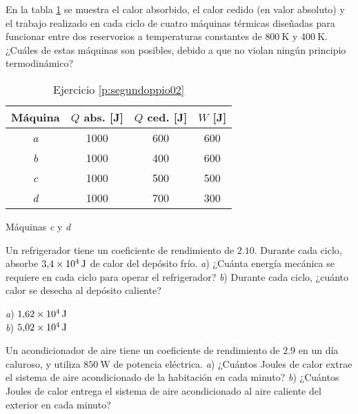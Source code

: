 %
\begin{Exercise}\label{p:segundoppio02}
  En la tabla \ref{t:segundoppio02} se muestra el calor absorbido, el calor cedido (en valor absoluto) y el trabajo realizado en cada ciclo de cuatro máquinas térmicas diseñadas para funcionar entre dos reservorios a temperaturas constantes de $\SI{800}{\kelvin}$ y $\SI{400}{\kelvin}$. ¿Cuáles de estas máquinas son posibles, debido a que no violan ningún principio termodinámico?\\
  \begin{table}[h]
    \caption{Ejercicio \ref{p:segundoppio02}}\label{t:segundoppio02}
    \centering
    \begin{tabular}{cccc}
        \hline
        \textbf{Máquina} & \textbf{$Q$ abs. [J]} & \textbf{$Q$ ced. [J]} & \textbf{$W$ [J]}\\
        \hline
        \textit{a} & 1000 & 600 & 600\\
        \textit{b} & 1000 & 400 & 600\\
        \textit{c} & 1000 & 500 & 500\\
        \textit{d} & 1000 & 700 & 300\\
        \hline
    \end{tabular}
  \end{table}
\end{Exercise}
\begin{Answer}
	\begin{minipage}[t]{.4\textwidth}
    Máquinas \textit{c} y \textit{d}
  \end{minipage}
\end{Answer}
%
\begin{Exercise}
  Un refrigerador tiene un coeficiente de rendimiento de $2.10$. Durante cada ciclo, absorbe $\SI{3.4E4}{\joule}$ de calor del depósito frío. \textit{a}) ¿Cuánta energía mecánica se requiere en cada ciclo para operar el refrigerador? \textit{b}) Durante cada ciclo, ¿cuánto calor se desecha al depósito caliente?
\end{Exercise}
\begin{Answer}
	\begin{minipage}[t]{.4\textwidth}
    \textit{a}) $\SI{1.62E4}{\joule}$\\ \textit{b}) $\SI{5.02E4}{\joule}$
  \end{minipage}
\end{Answer}
%
\begin{Exercise}
  Un acondicionador de aire tiene un coeficiente de rendimiento de $2.9$ en un día caluroso, y utiliza $\SI{850}{\watt}$ de potencia eléctrica. \textit{a}) ¿Cuántos Joules de calor extrae el sistema de aire acondicionado de la habitación en cada minuto? \textit{b}) ¿Cuántos Joules de calor entrega el sistema de aire acondicionado al aire caliente del exterior en cada minuto?
\end{Exercise}
